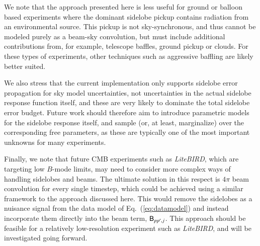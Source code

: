 \documentclass[twocolumn]{aa}
\def\LiteBIRD{\textit{LiteBIRD}}
\newcommand{\B}[0]{\tens{B}}
\begin{document}
We note that the approach presented here is less useful for ground or balloon based experiments where the dominant sidelobe pickup contains radiation from an environmental source. This pickup is not sky-synchronous, and thus cannot be modeled purely as a beam-sky convolution, but must include additional contributions from, for example, telescope baffles, ground pickup or clouds. For these types of experiments, other techniques such as aggressive baffling are likely better suited.

We also stress that the current implementation only supports sidelobe error propagation for sky model uncertainties, not uncertainties in the actual sidelobe response function itself, and these are very likely to dominate the total sidelobe error budget. Future work should therefore aim to introduce parametric models for the sidelobe response itself, and sample (or, at least, marginalize) over the corresponding free parameters, as these are typically one of the most important unknowns for many experiments.

Finally, we note that future CMB experiments such as \LiteBIRD, which are targeting low $B$-mode limits, may need to consider more complex ways of handling sidelobes and beams. The ultimate solution in this respect is $4\pi$ beam convolution for every single timestep, which could be achieved using a similar framework to the approach discussed here. This would remove the sidelobes as a nuisance signal from the data model of Eq.~(\ref{eq:datamodel}) and instead incorporate them directly into the beam term, $\B_{pp',j}$. This approach should be feasible for a relatively low-resolution experiment such as \LiteBIRD, and will be investigated going forward.






\end{document}

